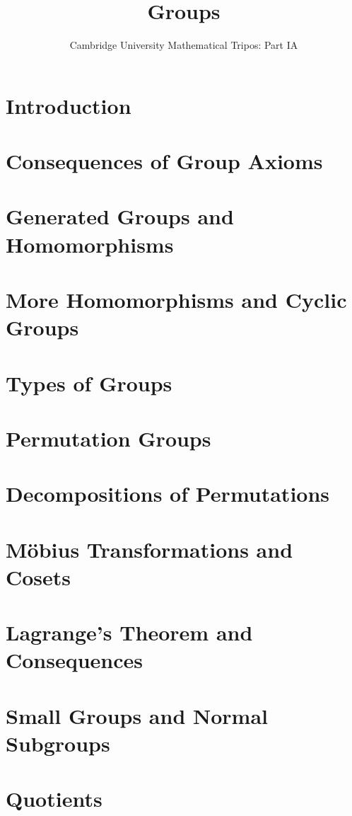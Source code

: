 \documentclass{article}
\title{Groups}
\author{Cambridge University Mathematical Tripos: Part IA}
\begin{document}
\maketitle

\tableofcontentsnewpage{}

\section{Introduction}

\section{Consequences of Group Axioms}

\section{Generated Groups and Homomorphisms}

\section{More Homomorphisms and Cyclic Groups}

\section{Types of Groups}

\section{Permutation Groups}

\section{Decompositions of Permutations}

\section{M\"obius Transformations and Cosets}

\section{Lagrange's Theorem and Consequences}

\section{Small Groups and Normal Subgroups}

\section{Quotients}

\end{document}
